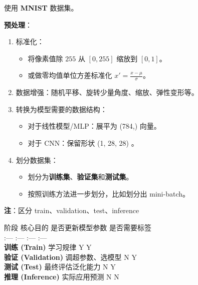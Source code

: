 使用 \textbf{MNIST} 数据集。

\textbf{预处理}：

\begin{enumerate}
  \def\labelenumi{\arabic{enumi}.}
  \tightlist
  \item
        标准化：

        \begin{itemize}
          \tightlist
          \item
                将像素值除 \(255\) 从 \([0,255]\) 缩放到 \([0,1]\)。
          \item
                或做零均值单位方差标准化 \(x' = \frac{x-\mu}{\sigma}\)。
        \end{itemize}
  \item
        数据增强：随机平移、旋转少量角度、缩放、弹性变形等。
  \item
        转换为模型需要的数据结构：

        \begin{itemize}
          \tightlist
          \item
                对于线性模型/MLP：展平为 (784,) 向量。
          \item
                对于 CNN：保留形状 (1, 28, 28) 。
        \end{itemize}
  \item
        划分数据集：

        \begin{itemize}
          \tightlist
          \item
                划分为\textbf{训练集}、\textbf{验证集}和\textbf{测试集}。
          \item
                按照训练方法进一步划分，比如划分出 mini-batch。
        \end{itemize}
\end{enumerate}

\textbf{注}：区分 train、validation、test、inference

阶段 \textbar{} 核心目的 \textbar{} 是否更新模型参数 \textbar{}
是否需要标签 \textbar{}\\
:--- \textbar{} :--- \textbar{} :--- \textbar{} :--- \textbar{}\\
\textbf{训练 (Train)} \textbar{} 学习规律 \textbar{} Y \textbar{} Y
\textbar{}\\
\textbf{验证 (Validation)} \textbar{} 调超参数、选模型 \textbar{} N
\textbar{} Y \textbar{}\\
\textbf{测试 (Test)} \textbar{} 最终评估泛化能力 \textbar{} N \textbar{}
Y \textbar{}\\
\textbf{推理 (Inference)} \textbar{} 实际应用预测 \textbar{} N
\textbar{} N \textbar{}

